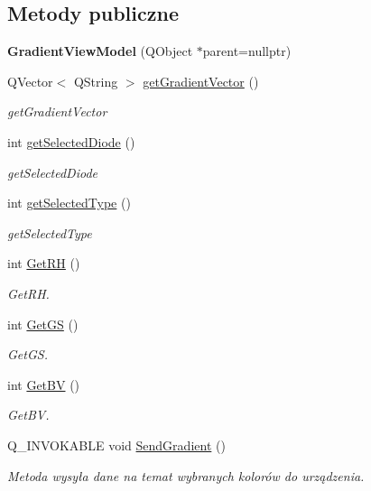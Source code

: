 \subsection*{Metody publiczne}
\begin{DoxyCompactItemize}
\item 
\mbox{\label{class_gradient_view_model_a4cb2509cf74f45c66ae720ac3a6429f1}} 
{\bfseries Gradient\+View\+Model} (Q\+Object $\ast$parent=nullptr)
\item 
Q\+Vector$<$ Q\+String $>$ \mbox{\hyperlink{class_gradient_view_model_a267819ee342ee0d7b8d59a07eca2f44a}{get\+Gradient\+Vector}} ()
\begin{DoxyCompactList}\small\item\em get\+Gradient\+Vector \end{DoxyCompactList}\item 
int \mbox{\hyperlink{class_gradient_view_model_afbe2bb56ec39369736a0e4969a94de5b}{get\+Selected\+Diode}} ()
\begin{DoxyCompactList}\small\item\em get\+Selected\+Diode \end{DoxyCompactList}\item 
int \mbox{\hyperlink{class_gradient_view_model_a44e6045ecb0d0ee9a9ab775e97ddf33c}{get\+Selected\+Type}} ()
\begin{DoxyCompactList}\small\item\em get\+Selected\+Type \end{DoxyCompactList}\item 
int \mbox{\hyperlink{class_gradient_view_model_af2ca9997921048e2ded10b40fd947ae5}{Get\+RH}} ()
\begin{DoxyCompactList}\small\item\em Get\+RH. \end{DoxyCompactList}\item 
int \mbox{\hyperlink{class_gradient_view_model_a2df0db48205c8f0f7c72743c1a5f960d}{Get\+GS}} ()
\begin{DoxyCompactList}\small\item\em Get\+GS. \end{DoxyCompactList}\item 
int \mbox{\hyperlink{class_gradient_view_model_ac3643df9744d6672719c7d15d9d8a544}{Get\+BV}} ()
\begin{DoxyCompactList}\small\item\em Get\+BV. \end{DoxyCompactList}\item 
\mbox{\label{class_gradient_view_model_a51315c70cc18585c645e05dcc73e6c57}} 
Q\+\_\+\+I\+N\+V\+O\+K\+A\+B\+LE void \mbox{\hyperlink{class_gradient_view_model_a51315c70cc18585c645e05dcc73e6c57}{Send\+Gradient}} ()
\begin{DoxyCompactList}\small\item\em Metoda wysyła dane na temat wybranych kolorów do urządzenia. \end{DoxyCompactList}\end{DoxyCompactItemize}
